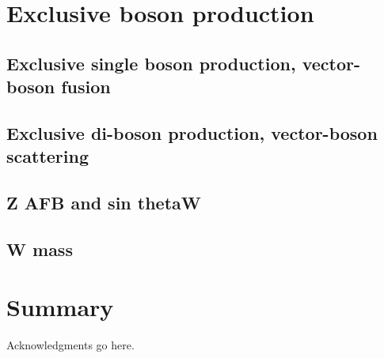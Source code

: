 \documentclass[12pt]{iopart}
\begin{document}
\section{Exclusive boson production}
\subsection{Exclusive single boson production, vector-boson fusion}


\subsection{Exclusive di-boson production, vector-boson scattering}


\subsection{Z AFB and sin thetaW}


\subsection{W mass}

\section{Summary}








\ack
Acknowledgments go here.



\end{document}
